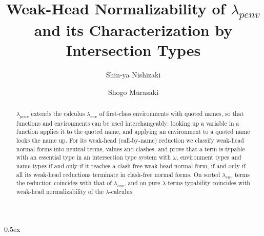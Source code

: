 \documentclass[11pt,a4paper]{article}
\begin{document}
\title{Weak-Head Normalizability of $\lambda_{penv}$\\and its Characterization by Intersection Types}
\author{Shin-ya Nishizaki \and Shogo Murasaki}
\maketitle

\begin{abstract}
$\lambda_{penv}$ extends the calculus $\lambda_{env}$ of first-class environments with
quoted names, so that functions and environments can be used interchangeably: looking
up a variable in a function applies it to the quoted name, and applying an environment
to a quoted name looks the name up.  For its weak-head (call-by-name) reduction we
classify weak-head normal forms into neutral terms, values and clashes, and prove that a
term is typable with an essential type in an intersection type system with $\omega$,
environment types and name types if and only if it reaches a clash-free weak-head normal
form, if and only if all its weak-head reductions terminate in clash-free normal forms.
On sorted $\lambda_{env}$ terms the reduction coincides with that of $\lambda_{env}$, and
on pure $\lambda$-terms typability coincides with weak-head normalizability of the
$\lambda$-calculus.
\end{abstract}

\tableofcontents

\parindent 0pt\parskip 0.5ex


\end{document}
